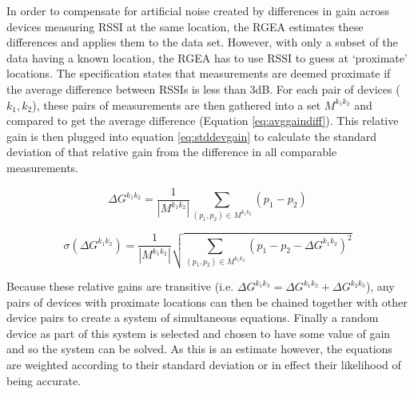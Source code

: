 \documentclass{UoYCSproject}
\begin{document}
            In order to compensate for artificial noise created by differences in gain across devices measuring RSSI at the same location, the RGEA estimates these differences and applies them to the data set. However, with only a subset of the data having a known location, the RGEA has to use RSSI to guess at `proximate' locations. The specification states that measurements are deemed proximate if the average difference between RSSIs is less than 3dB. For each pair of devices ($k_1,k_2$), these pairs of measurements are then gathered into a set $M^{k_1k_2}$ and compared to get the average difference (Equation \ref{eq:avggaindiff}). This relative gain is then plugged into equation \ref{eq:stddevgain} to calculate the standard deviation of that relative gain from the difference in all comparable measurements.
            
            \begin{equation}
            \label{eq:avggaindiff}
                \Delta G^{k_1k_2}=\dfrac{1}{|M^{k_1k_2}|} \sum_{(p_1,p_2)\in M^{k_1k_2}} (p_1 - p_2)
            \end{equation}
            
            \begin{equation}
            \label{eq:stddevgain}
                \sigma(\Delta G^{k_1k_2})=\dfrac{1}{|M^{k_1k_2}|} \sqrt{\sum_{(p_1,p_2)\in M^{k_1k_2}} (p_1 - p_2 - \Delta G^{k_1k_2})^2}
            \end{equation}
            
            Because these relative gains are transitive (i.e. $\Delta G^{k_1k_3} = \Delta G^{k_1k_2} + \Delta G^{k_2k_3}$), any pairs of devices with proximate locations can then be chained together with other device pairs to create a system of simultaneous equations. Finally a random device as part of this system is selected and chosen to have some value of gain and so the system can be solved. As this is an estimate however, the equations are weighted according to their standard deviation or in effect their likelihood of being accurate.
           
\end{document}
